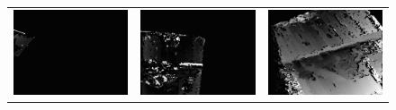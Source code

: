 \documentclass[11pt]{report}
\begin{document}
\begin{figure}[H]
\begin{tabular}{ccc}
    \includegraphics[scale=0.1]{images/disparity-opencv-t/disparity_18.png} &
    \includegraphics[scale=0.1]{images/disparity-opencv-d/disparity_18.png} &
    \includegraphics[scale=0.1]{images/disparity-opengv/disparity_18.png} \\

\end{tabular}
\end{figure}
\end{document}

